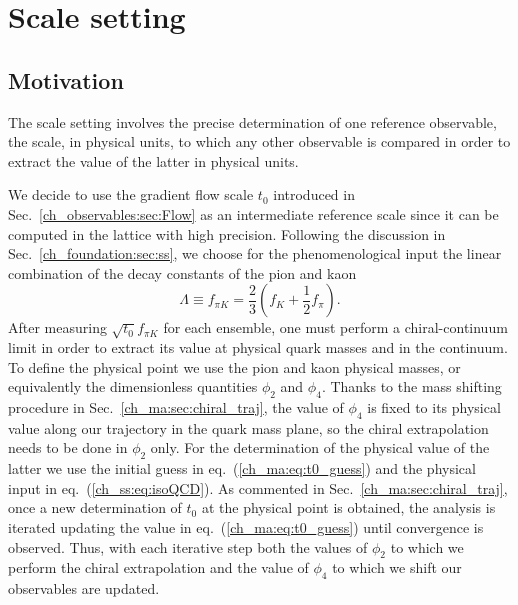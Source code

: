 \chapter{Scale setting}%


\label{ch_ss}


\section{Motivation}
\label{ch_ss:sec:introduction}

The scale setting involves the precise determination of one reference observable, the scale, in physical units, to which any other observable is compared in order to extract the value of the latter in physical units. 

We decide to use the gradient flow scale $t_0$ introduced in Sec.~\ref{ch_observables:sec:Flow} as an intermediate reference scale since it can be computed in the lattice with high precision. Following the discussion in Sec.~\ref{ch_foundation:sec:ss}, we choose for the phenomenological input the linear combination of the decay constants of the pion and kaon
\begin{equation}
\label{ch_ss:eq:fpik}
\Lambda\equiv f_{\pi K}=\frac{2}{3}\left(f_K+\frac{1}{2}f_{\pi}\right).
\end{equation}
After measuring $\sqrt{t_0}f_{\pi K}$ for each ensemble, one must perform a chiral-continuum limit in order to extract its value at physical quark masses and in the continuum. To define the physical point we use the pion and kaon physical masses, or equivalently the dimensionless quantities $\phi_2$ and $\phi_4$. Thanks to the mass shifting procedure in Sec.~\ref{ch_ma:sec:chiral_traj}, the value of $\phi_4$ is fixed to its physical value along our trajectory in the quark mass plane, so the chiral extrapolation needs to be done in $\phi_2$ only. For the determination of the physical value of the latter we use the initial guess in eq.~(\ref{ch_ma:eq:t0_guess}) and the physical input in eq.~(\ref{ch_ss:eq:isoQCD}). As commented in Sec.~\ref{ch_ma:sec:chiral_traj}, once a new determination of $t_0$ at the physical point is obtained, the analysis is iterated updating the value in eq.~(\ref{ch_ma:eq:t0_guess}) until convergence is observed. Thus, with each iterative step both the values of $\phi_2$ to which we perform the chiral extrapolation and the value of $\phi_4$ to which we shift our observables are updated. 

